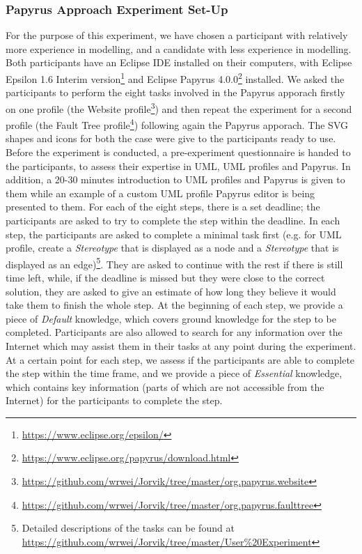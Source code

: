 \subsubsection{Papyrus Approach Experiment Set-Up}
For the purpose of this experiment, we have chosen a participant with relatively more experience in modelling, and a candidate with less experience in modelling. 
Both participants have an Eclipse IDE installed on their computers, with Eclipse Epsilon 1.6 Interim version\footnote{\url{https://www.eclipse.org/epsilon/}} and Eclipse Papyrus 4.0.0\footnote{\url{https://www.eclipse.org/papyrus/download.html}} installed.
We asked the participants to perform the eight tasks involved in the Papyrus apporach firstly on one profile (the Website profile\footnote{\url{https://github.com/wrwei/Jorvik/tree/master/org.papyrus.website}}) and then repeat the experiment for a second profile (the Fault Tree profile\footnote{\url{https://github.com/wrwei/Jorvik/tree/master/org.papyrus.faulttree}}) following again the Papyrus apporach. 
The SVG shapes and icons for both the case were give to the participants ready to use. 
Before the experiment is conducted, a pre-experiment questionnaire is handed to the participants, to assess their expertise in UML, UML profiles and Papyrus. 
In addition, a 20-30 minutes introduction to UML profiles and Papyrus is given to them while an example of a custom UML profile Papyrus editor is being presented to them. For each of the eight steps, there is a set deadline; the participants are asked to try to complete the step within the deadline.
In each step, the participants are asked to complete a minimal task first (e.g. for UML profile, create a \textit{Stereotype} that is displayed as a node and a \textit{Stereotype} that is displayed as an edge)\footnote{Detailed descriptions of the tasks can be found at \url{https://github.com/wrwei/Jorvik/tree/master/User\%20Experiment}}. They are asked to continue with the rest if there is still time left, while, if the deadline is missed but they were close to the correct solution, they are asked to give an estimate of how long they believe it would take them to finish the whole step.
At the beginning of each step, we provide a piece of \textit{Default} knowledge, which covers ground knowledge for the step to be completed. 
Participants are also allowed to search for any information over the Internet which may assist them in their tasks at any point during the experiment.
At a certain point for each step, we assess if the participants are able to complete the step within the time frame, and we provide a piece of \textit{Essential} knowledge, which contains key information (parts of which are not accessible from the Internet) for the participants to complete the step.

